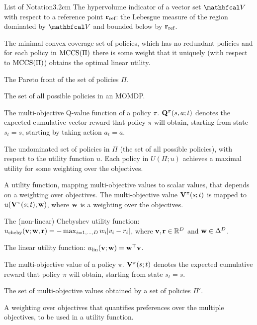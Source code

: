 \begin{mclistof}{List of Notation}{3.2cm}
        The \textnormal{hypervolume indicator} of a vector set $\bfcl{V}$ with respect to a reference point $\mathbf{r}_{\textnormal{ref}}$: the Lebesgue measure of the region dominated by $\bfcl{V}$ and bounded below by $\mathbf{r}_{\textnormal{ref}}$.
    \item[$\textnormal{MCCS}(\Pi)$]
        The minimal convex coverage set of policies, which has no redundant policies and for each policy in $\textnormal{MCCS}(\Pi)$ there is some weight that it uniquely (with respect to $\textnormal{MCCS}(\Pi)$) obtains the optimal linear utility.
    \item[$\textnormal{PF}(\Pi)$]
        The Pareto front of the set of policies $\Pi$.
    \item[$\Pi$] 
        The set of all possible policies in an MOMDP.
    \item[$\bff{Q}^{\pi}$]
        The multi-objective Q-value function of a policy $\pi$. $\mathbf{Q}^{\pi}(s,a;t)$ denotes the expected cumulative vector reward that policy $\pi$ will obtain, starting from state $s_t=s$, starting by taking action $a_t=a$.
    \item[$U(\Pi;u)$] 
        The undominated set of policies in $\Pi$ (the set of all possible policies), with respect to the utility function $u$. Each policy in $U(\Pi;u)$ achieves a maximal utility for some weighting over the objectives.
    \item[$u$] 
        A utility function, mapping multi-objective values to scalar values, that depends on a weighting over objectives. The multi-objective value $\mathbf{V}^{\pi}(s;t)$ is mapped to $u(\mathbf{V}^{\pi}(s;t);\mathbf{w})$, where $\bff{w}$ is a weighting over the objectives.
    \item[$\ucheby$]
        The (non-linear) Chebyshev utility function: ${u_{\textnormal{cheby}}}(\mathbf{v};\mathbf{w},\mathbf{r}) = - \max_{i=1,\ldots,D} w_i |v_i - r_i|$, where $\mathbf{v},\mathbf{r} \in \mathbb{R}^D$ and $\mathbf{w}\in\Delta^D$.
    \item[$u_{\lin}$]
        The linear utility function: $u_{{\textnormal{lin}}}(\mathbf{v};\mathbf{w}) = \mathbf{w}^\top \mathbf{v}$.
    \item[$\bff{V}^{\pi}$]
        The multi-objective value of a policy $\pi$. $\mathbf{V}^{\pi}(s;t)$ denotes the expected cumulative reward that policy $\pi$ will obtain, starting from state $s_t=s$.
    \item[$\valset(\Pi')$] 
        The set of multi-objective values obtained by a set of policies $\Pi'$.
    \item[$\bff{w}$] 
        A weighting over objectives that quantifies preferences over the multiple objectives, to be used in a utility function.

\end{mclistof}
